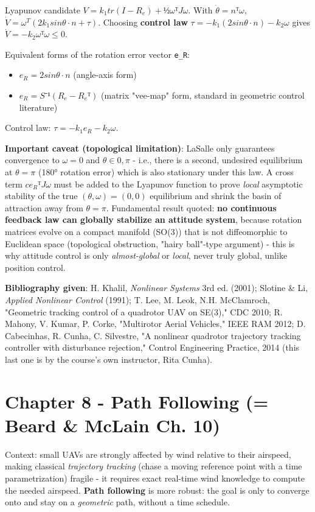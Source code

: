 \documentclass[11pt]{article}
\begin{document}
Lyapunov candidate $V = k_1 tr(I-R_e) + ½ωᵀJω$. With $\dot{θ} = nᵀω$, $\dot{V} = ω^T(2k_1 sinθ·n + τ)$. Choosing \textbf{control law} $τ = -k_1(2sinθ·n) - k_2ω$ gives $\dot{V} = -k_2ωᵀω ≤ 0$.

Equivalent forms of the rotation error vector \texttt{e\_\allowbreak{}R}:
\begin{itemize}
\item $e_R = 2 sinθ · n$ (angle-axis form)
\item $e_R = S⁻¹(R_e - R_eᵀ)$ (matrix "vee-map" form, standard in geometric control literature)
\end{itemize}

Control law: $τ = -k_1 e_R - k_2ω$.

\textbf{Important caveat (topological limitation)}: LaSalle only guarantees convergence to $ω=0$ and $θ∈{0,π}$ - i.e., there is a second, undesired equilibrium at $θ=π$ (180° rotation error) which is also stationary under this law. A cross term $ce_Rᵀ Jω$ must be added to the Lyapunov function to prove \textit{local} asymptotic stability of the true $(θ,ω)=(0,0)$ equilibrium and shrink the basin of attraction away from $θ=π$. Fundamental result quoted: \textbf{no continuous feedback law can globally stabilize an attitude system}, because rotation matrices evolve on a compact manifold (SO(3)) that is not diffeomorphic to Euclidean space (topological obstruction, "hairy ball"-type argument) - this is why attitude control is only \textit{almost-global} or \textit{local}, never truly global, unlike position control.

\textbf{Bibliography given}: H. Khalil, \textit{Nonlinear Systems} 3rd ed. (2001); Slotine \& Li, \textit{Applied Nonlinear Control} (1991); T. Lee, M. Leok, N.H. McClamroch, "Geometric tracking control of a quadrotor UAV on SE(3)," CDC 2010; R. Mahony, V. Kumar, P. Corke, "Multirotor Aerial Vehicles," IEEE RAM 2012; D. Cabecinhas, R. Cunha, C. Silvestre, "A nonlinear quadrotor trajectory tracking controller with disturbance rejection," Control Engineering Practice, 2014 (this last one is by the course's own instructor, Rita Cunha).

\section{Chapter 8 - Path Following (= Beard \& McLain Ch. 10)}

Context: small UAVs are strongly affected by wind relative to their airspeed, making classical \textit{trajectory tracking} (chase a moving reference point with a time parametrization) fragile - it requires exact real-time wind knowledge to compute the needed airspeed. \textbf{Path following} is more robust: the goal is only to converge onto and stay on a \textit{geometric} path, without a time schedule.
\end{document}
